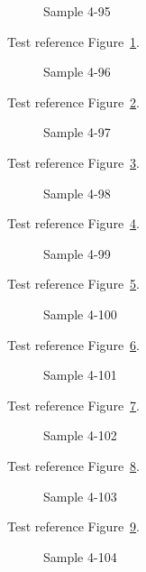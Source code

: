 \begin{figure}[tbhp]
\caption{Sample 4-95}
\label{fig:sample-4-95}
\end{figure}

Test reference Figure~\ref{fig:sample-4-95}.

\begin{figure}[tbhp]
\caption{Sample 4-96}
\label{fig:sample-4-96}
\end{figure}

Test reference Figure~\ref{fig:sample-4-96}.

\begin{figure}[tbhp]
\caption{Sample 4-97}
\label{fig:sample-4-97}
\end{figure}

Test reference Figure~\ref{fig:sample-4-97}.

\begin{figure}[tbhp]
\caption{Sample 4-98}
\label{fig:sample-4-98}
\end{figure}

Test reference Figure~\ref{fig:sample-4-98}.

\begin{figure}[tbhp]
\caption{Sample 4-99}
\label{fig:sample-4-99}
\end{figure}

Test reference Figure~\ref{fig:sample-4-99}.

\begin{figure}[tbhp]
\caption{Sample 4-100}
\label{fig:sample-4-100}
\end{figure}

Test reference Figure~\ref{fig:sample-4-100}.

\begin{figure}[tbhp]
\caption{Sample 4-101}
\label{fig:sample-4-101}
\end{figure}

Test reference Figure~\ref{fig:sample-4-101}.

\begin{figure}[tbhp]
\caption{Sample 4-102}
\label{fig:sample-4-102}
\end{figure}

Test reference Figure~\ref{fig:sample-4-102}.

\begin{figure}[tbhp]
\caption{Sample 4-103}
\label{fig:sample-4-103}
\end{figure}

Test reference Figure~\ref{fig:sample-4-103}.

\begin{figure}[tbhp]
\caption{Sample 4-104}
\label{fig:sample-4-104}
\end{figure}

